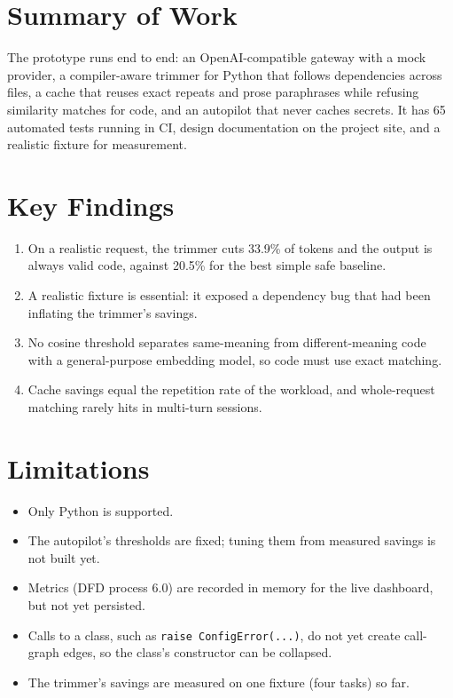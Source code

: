 \documentclass[12pt, a4paper, oneside]{report}
\newcommand{\code}[1]{\texttt{#1}}
\begin{document}
\section{Summary of Work}

The prototype runs end to end: an OpenAI-compatible gateway with a mock provider,
a compiler-aware trimmer for Python that follows dependencies across files, a
cache that reuses exact repeats and prose paraphrases while refusing similarity
matches for code, and an autopilot that never caches secrets. It has 65 automated tests running in
CI, design documentation on the project site, and a realistic fixture for
measurement.

\section{Key Findings}

\begin{enumerate}
    \item On a realistic request, the trimmer cuts 33.9\% of tokens and the output
          is always valid code, against 20.5\% for the best simple safe baseline.
    \item A realistic fixture is essential: it exposed a dependency bug that had
          been inflating the trimmer's savings.
    \item No cosine threshold separates same-meaning from different-meaning code
          with a general-purpose embedding model, so code must use exact matching.
    \item Cache savings equal the repetition rate of the workload, and whole-request
          matching rarely hits in multi-turn sessions.
\end{enumerate}

\section{Limitations}

\begin{itemize}
    \item Only Python is supported.
    \item The autopilot's thresholds are fixed; tuning them from measured
          savings is not built yet.
    \item Metrics (DFD process 6.0) are recorded in memory for the live dashboard, but not yet persisted.
    \item Calls to a class, such as \code{raise ConfigError(...)}, do not yet
          create call-graph edges, so the class's constructor can be collapsed.
    \item The trimmer's savings are measured on one fixture (four tasks) so far.
\end{itemize}
\end{document}
